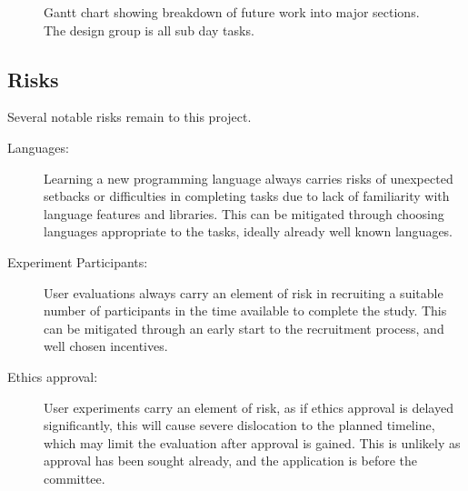 \begin{figure}[tbh]
{{\vskip 0.5cm}}
\caption{\protect\label{gantt}Gantt chart showing breakdown of future work into major sections. The design group is all sub day tasks.}
\end{figure}

\subsection{Risks}

Several notable risks remain to this project.
\begin{description}
\item[Languages:] Learning a new programming language always carries risks of unexpected setbacks or difficulties in completing tasks due to lack of familiarity with language features and libraries. This can be mitigated through choosing languages appropriate to the tasks, ideally already well known languages. 
\item[Experiment Participants:] User evaluations always carry an element of risk in recruiting a suitable number of participants in the time available to complete the study. This can be mitigated through an early start to the recruitment process, and well chosen incentives. 
\item[Ethics approval:] User experiments carry an element of risk, as if ethics approval is delayed significantly, this will cause severe dislocation to the planned timeline, which may limit the evaluation after approval is gained. This is unlikely as approval has been sought already, and the application is before the committee.  
\end{description}